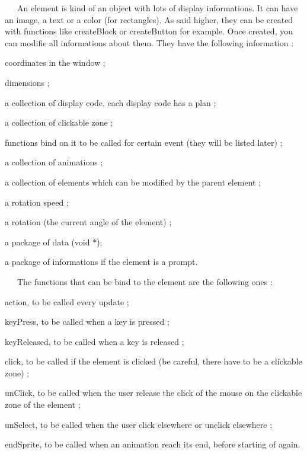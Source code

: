 ~~~An element is kind of an object with lots of display informations. It can have an image, a text or a color (for rectangles). As said higher, they can be created with functions like create\+Block or create\+Button for example. Once created, you can modifie all informations about them. They have the following information \+:
\begin{DoxyItemize}
\item coordinates in the window ;
\item dimensions ;
\item a collection of display code, each display code has a plan ;
\item a collection of clickable zone ;
\item functions bind on it to be called for certain event (they will be listed later) ;
\item a collection of animations ;
\item a collection of elements which can be modified by the parent element ;
\item a rotation speed ;
\item a rotation (the current angle of the element) ;
\item a package of data (void $\ast$);
\item a package of informations if the element is a prompt. ~\newline
~\newline

\end{DoxyItemize}

~~~The functions that can be bind to the element are the following ones \+:
\begin{DoxyItemize}
\item action, to be called every update ;
\item key\+Press, to be called when a key is pressed ;
\item key\+Released, to be called when a key is released ;
\item click, to be called if the element is clicked (be careful, there have to be a clickable zone) ;
\item un\+Click, to be called when the user release the click of the mouse on the clickable zone of the element ;
\item un\+Select, to be called when the user click elsewhere or unclick elsewhere ;
\item end\+Sprite, to be called when an animation reach its end, before starting of again. ~\newline
~\newline

\end{DoxyItemize}

